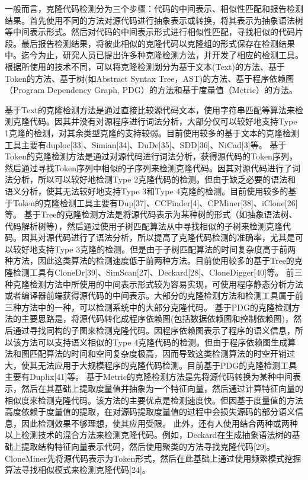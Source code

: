 一般而言，克隆代码检测分为三个步骤：代码的中间表示、相似性匹配和报告检测结果。首先使用不同的方法对源代码进行抽象表示或转换，将其表示为抽象语法树等中间表示形式。然后对代码的中间表示形式进行相似性匹配，寻找相似的代码片段。最后报告检测结果，将彼此相似的克隆代码以克隆组的形式保存在检测结果中。迄今为止，研究人员已提出许多种克隆检测方法，并开发了相应的检测工具。根据所使用的技术不同，可以将克隆检测划分为基于文本(Text)的方法、基于Token的方法、基于树(如Abstract Syntax Tree，AST)的方法、基于程序依赖图（Program Dependency Graph, PDG）的方法和基于度量值（Metric）的方法。

基于Text的克隆检测方法是通过直接比较源代码文本，使用字符串匹配等算法来检测克隆代码。因其并没有对源程序进行词法分析，大部分仅可以较好地支持Type 1克隆的检测，对其余类型克隆的支持较弱。目前使用较多的基于文本的克隆检测工具主要有duploc[33]、Simian[34]、DuDe[35]、SDD[36]、NiCad[3]等。
基于Token的克隆检测方法是通过对源代码进行词法分析，获得源代码的Token序列，然后通过寻找Token序列中相似的子序列来检测克隆代码。因其对源代码进行了词法分析，所以可以较好地检测Type 2克隆代码的检测。但由于缺乏必要的语法和语义分析，使其无法较好地支持Type 3和Type 4克隆的检测。目前使用较多的基于Token的克隆检测工具主要有Dup[37]、CCFinder[4]、CPMiner[38]、iClone[26]等。
基于Tree的克隆检测方法是将源代码表示为某种树的形式（如抽象语法树、代码解析树等），然后通过使用子树匹配算法从中寻找相似的子树来检测克隆代码。因其对源代码进行了语法分析，所以提高了克隆代码检测的准确率，尤其是可以较好地支持Type 3克隆的检测。但是由于子树匹配算法的时间复杂度高于前两种方法，因此这类算法的检测速度低于前两种方法。目前使用较多的基于Tree的克隆检测工具有CloneDr[39]、SimScan[27]、Deckard[28]、CloneDigger[40]等。
前三种克隆检测方法中所使用的中间表示形式较为容易实现，可使用程序静态分析方法或者编译器前端获得源代码的中间表示。大部分的克隆检测方法和检测工具属于前三种方法中的一种，可以检测系统中的大部分克隆代码。
基于PDG的克隆检测方法的主要思路是，将源代码转化成程序依赖图(包括数据依赖图和控制依赖图)，然后通过寻找同构的子图来检测克隆代码。因程序依赖图表示了程序的语义信息，所以该方法可以支持语义相似的Type 4克隆代码的检测。但由于程序依赖图生成算法和图匹配算法的时间和空间复杂度极高，因而导致这类检测算法的时空开销过大，使其无法应用于大规模程序的克隆代码检测。目前基于PDG的克隆检测工具主要有Duplix[41]等。
基于Metric的克隆检测方法是先将源代码转换为某种中间表示，然后在其基础上提取度量值并抽象为一个特征向量，然后通过计算特征向量的相似度来检测克隆代码。该方法的主要优点是检测速度快。但因基于度量值的方法高度依赖于度量值的提取，在对源码提取度量值的过程中会损失源码的部分语义信息，因此检测效果不够理想，使其应用受限。
此外，还有人使用结合两种或两种以上检测技术的混合方法来检测克隆代码。例如，Deckard在生成抽象语法树的基础上提取结构特征向量表示代码，然后使用聚类的方法寻找克隆代码[29]。CloneMiner先将源代码表示为Token形式，然后在此基础上通过使用频繁模式挖掘算法寻找相似模式来检测克隆代码[24]。

